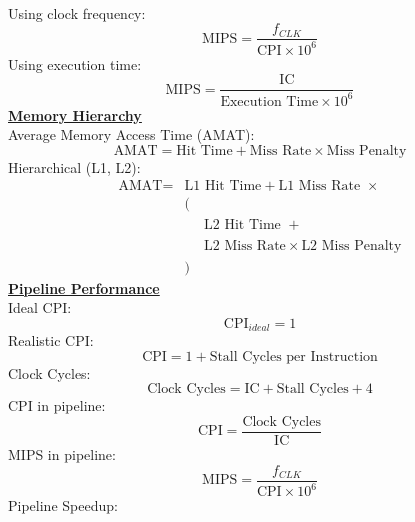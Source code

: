 \documentclass[a4paper,12pt]{article}
\begin{document}
\begin{multicols}{2}
    \\
    Using clock frequency:
    \begin{equation*}
        \text{MIPS} = \dfrac{f_{CLK}}{\text{CPI} \times 10^6}
    \end{equation*}
    Using execution time:
    \begin{equation*}
        \text{MIPS} = \dfrac{\text{IC}}{\text{Execution Time} \times 10^6}
    \end{equation*}
    \textbf{\underline{Memory Hierarchy}}
    \\
    Average Memory Access Time (AMAT):
    \begin{equation*}
        \text{AMAT} = \text{Hit Time} + \text{Miss Rate} \times \text{Miss Penalty}
    \end{equation*}
    Hierarchical (L1, L2):
    \begin{equation*}
        \begin{array}{rl}
            \text{AMAT} =& \text{L1 Hit Time} + \text{L1 Miss Rate } \times \\
            & ( \\
            &  \phantom{(}\quad\text{L2 Hit Time } + \\
            &  \phantom{(}\quad \text{L2 Miss Rate} \times \text{L2 Miss Penalty} \\
            & )
        \end{array}
    \end{equation*}
    \textbf{\underline{Pipeline Performance}}
    \\
    Ideal CPI:
    \begin{equation*}
        \text{CPI}_{ideal} = 1
    \end{equation*}
    Realistic CPI:
    \begin{equation*}
        \text{CPI} = 1 + \text{Stall Cycles per Instruction}
    \end{equation*}
    Clock Cycles:
    \begin{equation*}
        \text{Clock Cycles} = \text{IC} + \text{Stall Cycles} + 4
    \end{equation*}
    CPI in pipeline:
    \begin{equation*}
        \text{CPI} = \frac{\text{Clock Cycles}}{\text{IC}}
    \end{equation*}
    MIPS in pipeline:
    \begin{equation*}
        \text{MIPS} = \frac{f_{CLK}}{\text{CPI} \times 10^6}
    \end{equation*}
    Pipeline Speedup:

\end{multicols}
\end{document}
